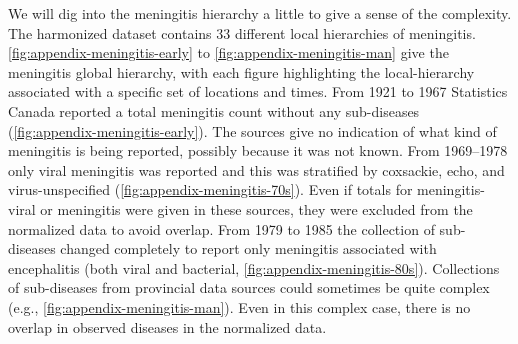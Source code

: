 \documentclass[12pt]{article}
\begin{document}
We will dig into the meningitis hierarchy a little to give a sense of the complexity. The harmonized dataset contains 33 different local hierarchies of meningitis. \cref{fig:appendix-meningitis-early} to \cref{fig:appendix-meningitis-man} give the meningitis global hierarchy, with each figure highlighting the local-hierarchy associated with a specific set of locations and times. From 1921 to 1967 Statistics Canada reported a total meningitis count without any sub-diseases (\cref{fig:appendix-meningitis-early}). The sources give no indication of what kind of meningitis is being reported, possibly because it was not known. From 1969--1978 only viral meningitis was reported and this was stratified by coxsackie, echo, and virus-unspecified (\cref{fig:appendix-meningitis-70s}). Even if totals for meningitis-viral or meningitis were given in these sources, they were excluded from the normalized data to avoid overlap. From 1979 to 1985 the collection of sub-diseases changed completely to report only meningitis associated with encephalitis (both viral and bacterial, \cref{fig:appendix-meningitis-80s}). Collections of sub-diseases from provincial data sources could sometimes be quite complex (e.g., \cref{fig:appendix-meningitis-man}). Even in this complex case, there is no overlap in observed diseases in the normalized data.
\end{document}
